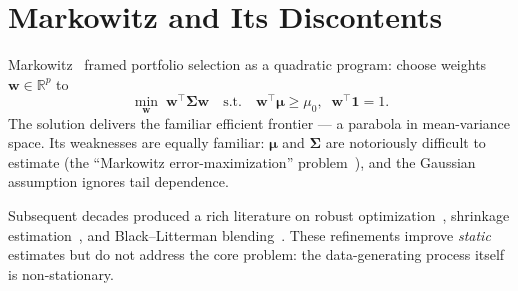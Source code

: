 \section{Markowitz and Its Discontents}

Markowitz~\cite{markowitz1952} framed portfolio selection as a quadratic program: choose weights $\mathbf{w} \in \mathbb{R}^p$ to
\begin{equation}
\min_{\mathbf{w}}\; \mathbf{w}^{\!\top}\boldsymbol{\Sigma}\mathbf{w} \quad \text{s.t.} \quad \mathbf{w}^{\!\top}\boldsymbol{\mu} \geq \mu_0,\;\; \mathbf{w}^{\!\top}\mathbf{1} = 1.
\label{eq:markowitz}
\end{equation}
The solution delivers the familiar efficient frontier --- a parabola in mean-variance space. Its weaknesses are equally familiar: $\boldsymbol{\mu}$ and $\boldsymbol{\Sigma}$ are notoriously difficult to estimate (the ``Markowitz error-maximization'' problem~\cite{michaud1989}), and the Gaussian assumption ignores tail dependence.

Subsequent decades produced a rich literature on robust optimization~\cite{fabozzi2007}, shrinkage estimation~\cite{ledoit2004}, and Black--Litterman blending~\cite{black1992}. These refinements improve \textit{static} estimates but do not address the core problem: the data-generating process itself is non-stationary.
